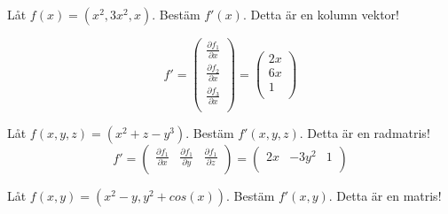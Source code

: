 \documentclass{report}
\begin{document}
\qs{}
{
	Låt $ f(x) = (x^2, 3x^2, x) $. Bestäm $ f'(x) $. Detta är en kolumn vektor!
}

\sol 
\begin{equation*}
f' = 
\begin{pmatrix}
	\frac{\partial f_1 }{\partial x }  \\
	\frac{\partial f_2 }{\partial x }  \\
	\frac{\partial f_3 }{\partial x }  \\
\end{pmatrix}
 = 
\begin{pmatrix}
	2x \\
	6x \\
	1 \\
\end{pmatrix}
\end{equation*}

\vspace{20pt}
\qs{}
{
	Låt $ f(x,y,z) = (x^2+z-y^3) $. Bestäm $ f'(x,y,z) $. Detta är en radmatris!
}
\sol 
\begin{equation*}
f' =
\begin{pmatrix}
	\frac{\partial f_1 }{\partial x }  & \frac{\partial f_1 }{\partial y }  & \frac{\partial f_1 }{\partial z }  \\
\end{pmatrix}
=
\begin{pmatrix}
	2x & -3y^2 & 1 \\
\end{pmatrix}
\end{equation*}

\vspace{20pt}
\qs{}
{
Låt $ f(x,y) = (x^2-y, y^2 + cos(x)) $. Bestäm $ f'(x,y) $. Detta är en matris!
}
\end{document}
